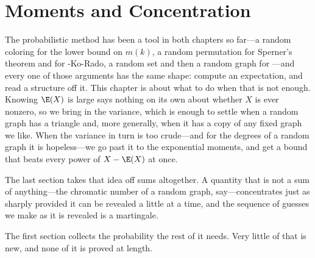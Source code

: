\chapter{Moments and Concentration} \label{Ch3:CH}
\thispagestyle{empty}

The probabilistic method has been a tool in both chapters so far---a random coloring for the lower bound on $m(k)$, a random permutation for Sperner's theorem and for \Erdos-Ko-Rado, a random set and then a random graph for ---and every one of those arguments has the same shape: compute an expectation, and read a structure off it. This chapter is about what to do when that is not enough. Knowing $\E(X)$ is large says nothing on its own about whether $X$ is ever nonzero, so we bring in the variance, which is enough to settle when a random graph has a triangle and, more generally, when it has a copy of any fixed graph we like. When the variance in turn is too crude---and for the degrees of a random graph it is hopeless---we go past it to the exponential moments, and get a bound that beats every power of $X - \E(X)$ at once.

The last section takes that idea off sums altogether. A quantity that is not a sum of anything---the chromatic number of a random graph, say---concentrates just as sharply provided it can be revealed a little at a time, and the sequence of guesses we make as it is revealed is a martingale.

The first section collects the probability the rest of it needs. Very little of that is new, and none of it is proved at length.






